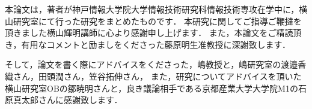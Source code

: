 本論文は，著者が神戸情報大学院大学情報技術研究科情報技術専攻在学中に，横山研究室にて行った研究をまとめたものです．
本研究に関してご指導ご鞭撻を頂きました横山輝明講師に心より感謝申し上げます．
また，本論文をご精読頂き，有用なコメントと励ましをくださった藤原明生准教授に深謝致します．
\medskip

そして，論文を書く際にアドバイスをくださった，嶋教授と，嶋研究室の渡邉香織さん，田頭潤さん，笠谷拓伸さん，
また，研究についてアドバイスを頂いた横山研究室OBの鄒暁明さんと，良き議論相手である京都産業大学大学院M1の石原真太郎さんに感謝致します．




